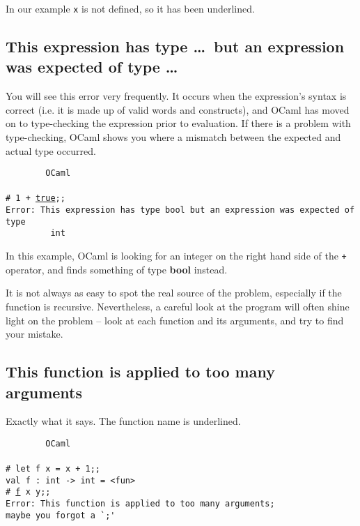 \documentclass[]{book}
\newcommand{\smspace}{\vspace{4mm}}
\begin{document}
\noindent In our example \texttt{x} is not defined, so it has been underlined.

\subsection*{This expression has type \ldots\ but an expression was expected of type \ldots}

You will see this error very frequently. It occurs when the expression's syntax is correct (i.e. it is made up of valid words and constructs), and OCaml has moved on to type-checking the expression prior to evaluation. If there is a problem with type-checking, OCaml shows you where a mismatch between the expected and actual type occurred.

\smspace
\noindent\verb!        OCaml!\\
\noindent\\
\texttt{\# 1 + \underline{true};;}\\
\texttt{Error:\ This expression has type bool but an expression was expected of type}\\
\verb!         !\texttt{int}
\smspace

\noindent In this example, OCaml is looking for an integer on the right hand side of the \texttt{+} operator, and finds something of type \textsf{\textbf{bool}} instead.

It is not always as easy to spot the real source of the problem, especially if the function is recursive. Nevertheless, a careful look at the program will often shine light on the problem -- look at each function and its arguments, and try to find your mistake.

\subsection*{This function is applied to too many arguments}

Exactly what it says. The function name is underlined. 

\smspace
\noindent\verb!        OCaml!\\
\noindent\\
\texttt{\# let f x = x + 1;;}\\
\texttt{val f :\ int -> int = <fun>}\\
\texttt{\# \underline{f} x y;;}\\
\texttt{Error:\ This function is applied to too many arguments;}\\
\texttt{maybe you forgot a }\verb!`;'!
\smspace
\end{document}
